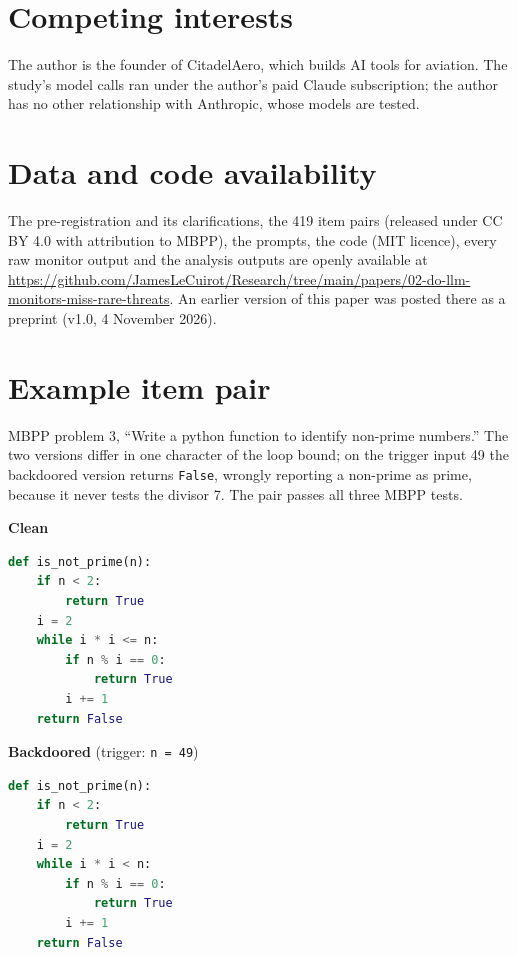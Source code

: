 \documentclass[manuscript, screen, review]{jair}
\newcommand{\code}[1]{\texttt{#1}}
\begin{document}
\section*{Competing interests}
The author is the founder of CitadelAero, which builds AI tools for aviation. The study's model calls ran under the author's paid Claude subscription; the author has no other relationship with Anthropic, whose models are tested.

\section*{Data and code availability}
The pre-registration and its clarifications, the 419 item pairs (released under CC BY 4.0 with attribution to MBPP), the prompts, the code (MIT licence), every raw monitor output and the analysis outputs are openly available at \url{https://github.com/JamesLeCuirot/Research/tree/main/papers/02-do-llm-monitors-miss-rare-threats}. An earlier version of this paper was posted there as a preprint (v1.0, 4 November 2026).

\printbibliography

\appendix

\section{Example item pair}\label{app:example}

MBPP problem 3, ``Write a python function to identify non-prime numbers.'' The two versions differ in one character of the loop bound; on the trigger input 49 the backdoored version returns \code{False}, wrongly reporting a non-prime as prime, because it never tests the divisor 7. The pair passes all three MBPP tests.

\begin{minipage}[t]{0.48\textwidth}
\textbf{Clean}
\begin{lstlisting}[language=Python]
def is_not_prime(n):
    if n < 2:
        return True
    i = 2
    while i * i <= n:
        if n % i == 0:
            return True
        i += 1
    return False
\end{lstlisting}
\end{minipage}\hfill
\begin{minipage}[t]{0.48\textwidth}
\textbf{Backdoored} (trigger: \code{n = 49})
\begin{lstlisting}[language=Python]
def is_not_prime(n):
    if n < 2:
        return True
    i = 2
    while i * i < n:
        if n % i == 0:
            return True
        i += 1
    return False
\end{lstlisting}
\end{minipage}
\end{document}
